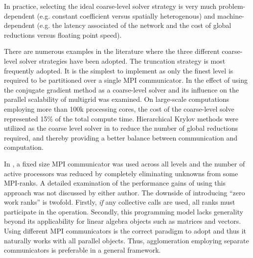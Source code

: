 \documentclass[]{siamart0216}
\begin{document}
In practice, selecting the ideal coarse-level solver strategy is very much 
problem-dependent (e.g. constant coefficient versus spatially heterogenous) 
and machine-dependent (e.g. the latency associated of the network and the 
cost of global reductions versus floating point speed).

There are numerous examples in the literature where the three different coarse-level solver strategies have been adopted.
The truncation strategy is most frequently adopted. It is the simplest to implement 
as only the finest level is required to be partitioned over a single MPI communicator. 
In \cite{gmeiner2014parallel, gmeiner2015performance, gmeiner2015towards} the effect of using 
the conjugate gradient method as a coarse-level solver 
and its influence on the parallel scalability of multigrid was examined. On large-scale computations employing more than 100k processing cores, 
the cost of the coarse-level solve represented 15\% of the total compute time. 
Hierarchical Krylov methods \cite{mcinnes2014hierarchical} were utilized as the coarse level solver in \cite{may2015scalable} to reduce the number of global reductions required, and thereby providing a better balance between communication and computation. 



In \cite{Adams:2004:UIF:1048933.1049978, sundar2012parallel}, a fixed size MPI communicator was used across all levels and 
the number of active processors was reduced by completely eliminating unknowns from some MPI-ranks.  
A detailed examination of the performance gains of using this approach was not discussed by either author.
The downside of introducing ``zero work ranks'' is twofold. 
Firstly, \textit{if} any collective calls are used, all ranks must participate in the operation. 
Secondly, this programming model lacks generality beyond its applicability for linear algebra objects such as matrices and vectors. 
Using different MPI communicators is the correct paradigm to adopt and thus it naturally works with all parallel objects. 
Thus, agglomeration employing separate communicators is preferable in a general framework.
\end{document}
